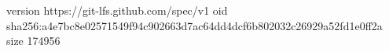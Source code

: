 version https://git-lfs.github.com/spec/v1
oid sha256:a4e7bc8e02571549f94c902663d7ac64dd4dcf6b802032c26929a52fd1e0ff2a
size 174956
